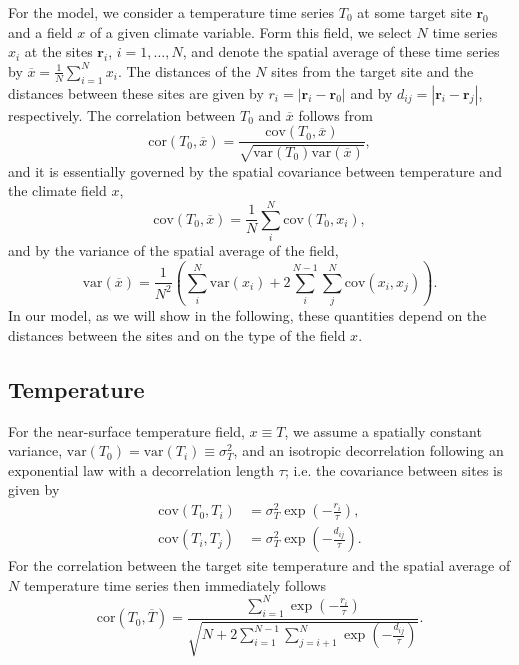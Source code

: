 \documentclass[cp, manuscript]{copernicus}
\begin{document}
For the model, we consider a temperature time series $T_0$ at some target site
$\mathbf{r}_0$ and a field $x$ of a given climate variable. Form this field, we
select $N$ time series $x_i$ at the sites $\mathbf{r}_i$, $i=1,\dotsc,N$, and
denote the spatial average of these time series by
$\overline{x}=\frac{1}{N}\sum_{i=1}^{N}{x_i}$. The distances of the $N$ sites
from the target site and the distances between these sites are given by
$r_i=|\mathbf{r}_i-\mathbf{r}_0|$ and by $d_{ij}=|{\mathbf{r}_i-\mathbf{r}_j}|$,
respectively. The correlation between $T_0$ and $\overline{x}$ follows from
%
\begin{equation}
\label{eq:corr.general}
\mathrm{cor}(T_0,\overline{x})=\frac
{\mathrm{cov}(T_0,\overline{x})}
{\sqrt{\mathrm{var}(T_0)\mathrm{var}(\overline{x})}},
\end{equation}
and it is essentially governed by the spatial covariance between temperature and
the climate field $x$,
%
\begin{equation}
\label{eq:cov.general}
\mathrm{cov}(T_0,\overline{x})=
\frac{1}{N}\sum_{i}^{N}{\mathrm{cov}(T_0,x_i)},
\end{equation}
%
and by the variance of the spatial average of the field,
\begin{equation}
\label{eq:var.general}
\mathrm{var}(\overline{x})=
\frac{1}{N^2}\left(
\sum_{i}^{N}{\mathrm{var}(x_i)} +
2\sum_{i}^{N-1}\sum_{j}^{N}{\mathrm{cov}(x_i,x_j)}
\right).
\end{equation}
%
In our model, as we will show in the following, these quantities depend on the
distances between the sites and on the type of the field $x$.

\subsection{Temperature}
\label{app:concept.model.t2m}

For the near-surface temperature field, $x \equiv T$, we assume a spatially
constant variance, $\mathrm{var}(T_0)=\mathrm{var}(T_i)\equiv\sigma_T^2$, and an
isotropic decorrelation following an exponential law with a decorrelation length
$\tau$; i.e. the covariance between sites is given by
%
\begin{align}
\label{eq:t2m.decorr}
\mathrm{cov}(T_0,T_i)&=\sigma_T^2\exp{\left(-\frac{r_i}{\tau}\right)},\\
\mathrm{cov}(T_i,T_j)&=\sigma_T^2\exp{\left(-\frac{d_{ij}}{\tau}\right)}.
\end{align}
%
For the correlation between the target site temperature and the spatial average
of $N$ temperature time series then immediately follows
%
\begin{equation}
\label{eq:t2m.corr}
\mathrm{cor}(T_0,\overline{T})=
\frac{\sum_{i=1}^{N}\exp{\left(-\frac{r_i}{\tau}\right)}}
{\sqrt{N+2\sum_{i=1}^{N-1}
\sum_{j=i+1}^{N}{\exp{\left(-\frac{d_{ij}}{\tau}\right)}}}}.
\end{equation}
\end{document}
